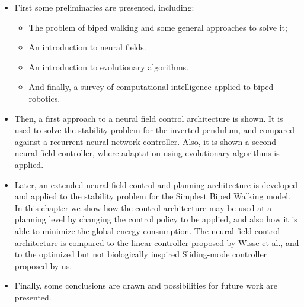 \begin{itemize}
\item First some preliminaries are presented, including:
  \begin{itemize}
  \item The problem of biped walking and some general approaches to
    solve it;
  \item An introduction to neural fields.
  \item An introduction to evolutionary algorithms.
  \item And finally, a survey of computational intelligence applied to
    biped robotics.
  \end{itemize}
\item Then, a first approach to a neural field control architecture is
  shown. It is used to solve the stability problem for the inverted
  pendulum, and compared against a recurrent neural network
  controller. Also, it is shown a second neural field controller,
  where adaptation using evolutionary algorithms is applied.
\item Later, an extended neural field control and planning
  architecture is developed and applied to the stability problem for
  the Simplest Biped Walking model. In this chapter we show how the
  control architecture may be used at a planning level by changing the
  control policy to be applied, and also how it is able to minimize
  the global energy consumption. The neural field control architecture
  is compared to the linear controller proposed by Wisse et al., and
  to the optimized but not biologically inspired Sliding-mode
  controller proposed by us.
\item Finally, some conclusions are drawn and possibilities for future
  work are presented.
\end{itemize}



